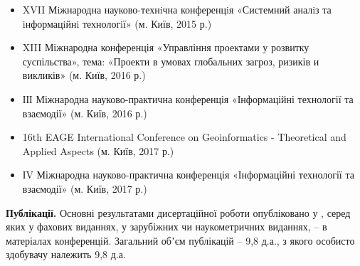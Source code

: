 \begin{itemize}
	\item XVII Мiжнародна науково-технiчна конференцiя «Системний аналiз та iнформацiйнi технологiї» (м. Київ, 2015 р.)
	\item XIII Міжнародна конференція «Управління проектами у розвитку суспільства», тема: «Проекти в умовах глобальних загроз, ризиків и викликів» (м. Київ, 2016 р.)
	\item ІІІ Міжнародна науково-практична конференція «Інформаційні технології та взаємодії» (м. Київ, 2016 р.)
	\item 16th EAGE International Conference on Geoinformatics - Theoretical and Applied Aspects (м. Київ, 2017 р.)
	\item ІV Міжнародна науково-практична конференція «Інформаційні технології та взаємодії» (м. Київ, 2017 р.)
\end{itemize}


\printbibliography[heading=countauthor, env=countauthor, keyword=biblioauthor, section=1]%
\printbibliography[heading=countauthorvak, env=countauthorvak, keyword=biblioauthorvak, section=1]%
\printbibliography[heading=countauthorconf, env=countauthorconf, keyword=biblioauthorconf, section=1]%
\printbibliography[heading=countauthornotvak, env=countauthornotvak, keyword=biblioauthornotvak, section=1]%
\printbibliography[heading=countauthoreng, env=countauthoreng, category=biblioauthoreng, section=1]%

\textbf{Публікації.} 
Основні результатами дисертаційної роботи опубліковано у 
, серед яких 
 у фахових виданнях, 
 у зарубіжних чи наукометричних виданнях, 
 – в матеріалах конференцій. 
Загальний обʼєм публікацій – 9,8 д.а., з якого особисто здобувачу належить 9,8 д.а.


